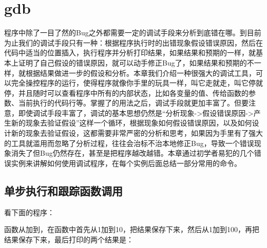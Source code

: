 

\chapter{gdb}
%
程序中除了一目了然的Bug之外都需要一定的调试手段来分析到底错在哪。到目前为止我们的调试手段只有一种：根据程序执行时的出错现象假设错误原因，然后在代码中适当的位置插入，执行程序并分析打印结果，如果结果和预期的一样，就基本上证明了自己假设的错误原因，就可以动手修正Bug了，如果结果和预期的不一样，就根据结果做进一步的假设和分析。本章我们介绍一种很强大的调试工具，可以完全操控程序的运行，使得程序就像你手里的玩具一样，叫它走就走，叫它停就停，并且随时可以查看程序中所有的内部状态，比如各变量的值、传给函数的参数、当前执行的代码行等。掌握了的用法之后，调试手段就更加丰富了。但要注意，即使调试手段丰富了，调试的基本思想仍然是“分析现象-\textgreater{}假设错误原因-\textgreater{}产生新的现象去验证假设”这样一个循环，根据现象如何假设错误原因，以及如何设计新的现象去验证假设，这都需要非常严密的分析和思考，如果因为手里有了强大的工具就滥用而忽略了分析过程，往往会治标不治本地修正Bug，导致一个错误现象消失了但Bug仍然存在，甚至是把程序越改越错。本章通过初学者易犯的几个错误实例来讲解如何使用调试程序，在每个实例后面总结一部分常用的命令。




\section{单步执行和跟踪函数调用}
%
看下面的程序：





函数从加到，在函数中首先从1加到10，把结果保存下来，然后从1加到100，再把结果保存下来，最后打印的两个结果是：




